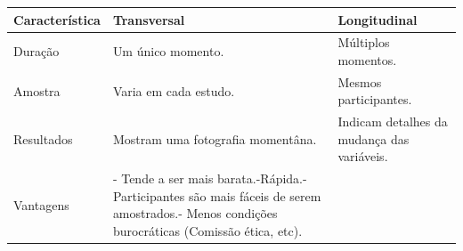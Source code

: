 \documentclass[
]{book}
\begin{document}
\begin{longtable}[]{@{}lll@{}}
\toprule
\begin{minipage}[b]{0.31\columnwidth}\raggedright
Característica\strut
\end{minipage} & \begin{minipage}[b]{0.29\columnwidth}\raggedright
Transversal\strut
\end{minipage} & \begin{minipage}[b]{0.31\columnwidth}\raggedright
Longitudinal\strut
\end{minipage}\tabularnewline
\midrule
\endhead
\begin{minipage}[t]{0.31\columnwidth}\raggedright
Duração\strut
\end{minipage} & \begin{minipage}[t]{0.29\columnwidth}\raggedright
Um único momento.\strut
\end{minipage} & \begin{minipage}[t]{0.31\columnwidth}\raggedright
Múltiplos momentos.\strut
\end{minipage}\tabularnewline
\begin{minipage}[t]{0.31\columnwidth}\raggedright
Amostra\strut
\end{minipage} & \begin{minipage}[t]{0.29\columnwidth}\raggedright
Varia em cada estudo.\strut
\end{minipage} & \begin{minipage}[t]{0.31\columnwidth}\raggedright
Mesmos participantes.\strut
\end{minipage}\tabularnewline
\begin{minipage}[t]{0.31\columnwidth}\raggedright
Resultados\strut
\end{minipage} & \begin{minipage}[t]{0.29\columnwidth}\raggedright
Mostram uma fotografia momentâna.\strut
\end{minipage} & \begin{minipage}[t]{0.31\columnwidth}\raggedright
Indicam detalhes da mudança das variáveis.\strut
\end{minipage}\tabularnewline
\begin{minipage}[t]{0.31\columnwidth}\raggedright
Vantagens\strut
\end{minipage} & \begin{minipage}[t]{0.29\columnwidth}\raggedright
- Tende a ser mais barata.-Rápida.-Participantes são mais fáceis de
serem amostrados.- Menos condições burocráticas (Comissão ética,
etc).\strut

\end{minipage}
\end{longtable}
\end{document}
